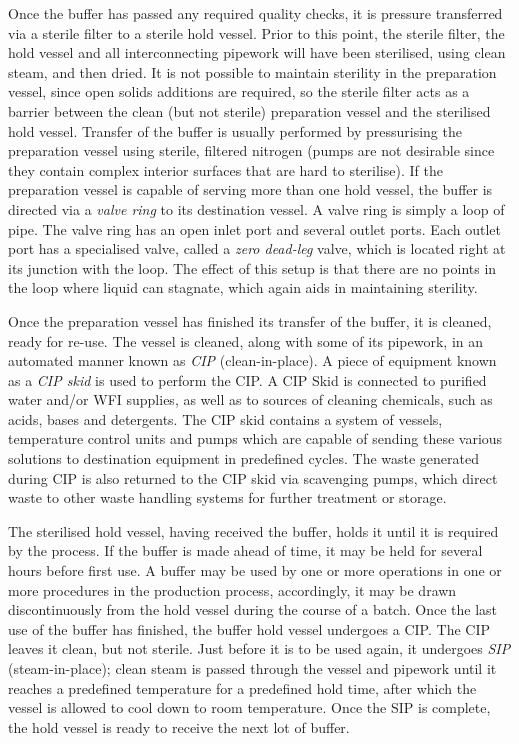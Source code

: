 Once the buffer has passed any required quality checks, it is pressure
transferred via a sterile filter to a sterile hold vessel.
Prior to this point, the sterile filter, the hold vessel and all
interconnecting pipework will have been sterilised, using clean steam, and then
dried.  
It is not possible to maintain sterility in the preparation vessel,
since open solids additions are required, so the sterile filter acts as a
barrier between the clean (but not sterile) preparation vessel and the
sterilised hold vessel.
Transfer of the buffer is usually performed by pressurising the preparation
vessel using sterile, filtered nitrogen (pumps are not desirable since they
contain complex interior surfaces that are hard to sterilise).
If the preparation vessel is capable of serving more than one hold vessel, the
buffer is directed via a \emph{valve ring} to its destination vessel.
A valve ring is simply a loop of pipe.
The valve ring has an open inlet port and several outlet ports.
Each outlet port has a specialised valve, called a \emph{zero dead-leg} valve,
which is located right at its junction with the loop.
The effect of this setup is that there are no points in the loop where liquid
can stagnate, which again aids in maintaining sterility.

Once the preparation vessel has finished its transfer of the buffer, it is
cleaned, ready for re-use.
The vessel is cleaned, along with some of its pipework, in an automated manner
known as \emph{CIP} (clean-in-place).
A piece of equipment known as a \emph{CIP skid} is used to perform the CIP.
A CIP Skid is connected to purified water and/or WFI supplies, as well as
to sources of cleaning chemicals, such as acids, bases and detergents.
The CIP skid contains a system of vessels, temperature control units and pumps
which are capable of sending these various solutions to destination equipment
in predefined cycles.  The waste generated during CIP is also returned to the
CIP skid via scavenging pumps, which direct waste to other waste handling
systems for further treatment or storage.

The sterilised hold vessel, having received the buffer, holds it until it is
required by the process.
If the buffer is made ahead of time, it may be held for several hours before
first use.
A buffer may be used by one or more operations in one or more procedures in the
production process, accordingly, it may be drawn discontinuously from the hold
vessel during the course of a batch.
Once the last use of the buffer has finished, the buffer hold vessel undergoes
a CIP.
The CIP leaves it clean, but not sterile.
Just before it is to be used again, it undergoes \emph{SIP} (steam-in-place);
clean steam is passed through the vessel and pipework until it reaches a
predefined temperature for a predefined hold time, after which the vessel is
allowed to cool down to room temperature.
Once the SIP is complete, the hold vessel is ready to receive the next lot of
buffer.

